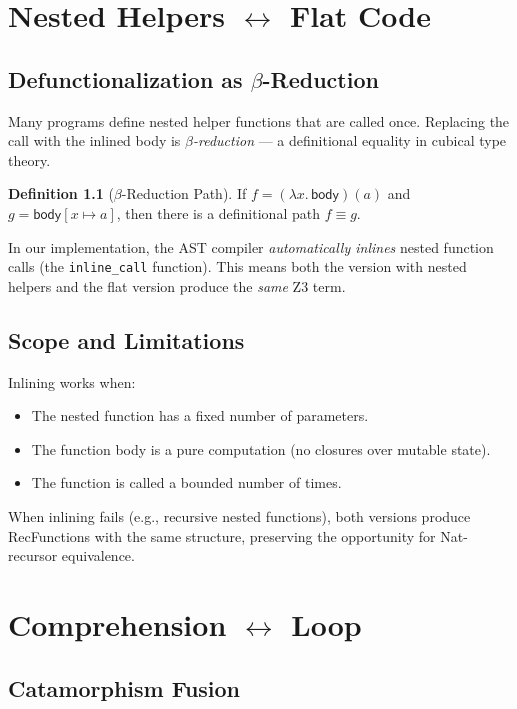 \documentclass[11pt,a4paper]{report}
\theoremstyle{definition}
\newtheorem{definition}{Definition}[chapter]
\theoremstyle{plain}
\begin{document}
\chapter{Nested Helpers $\leftrightarrow$ Flat Code}
\label{ch:defunc}

\section{Defunctionalization as $\beta$-Reduction}

Many programs define nested helper functions that are called once.
Replacing the call with the inlined body is \emph{$\beta$-reduction}
--- a definitional equality in cubical type theory.

\begin{definition}[$\beta$-Reduction Path]
If $f = (\lambda x. \, \mathsf{body})(a)$ and $g = \mathsf{body}[x
\mapsto a]$, then there is a definitional path $f \equiv g$.
\end{definition}

In our implementation, the AST compiler \emph{automatically inlines}
nested function calls (the \texttt{inline\_call} function).  This means
both the version with nested helpers and the flat version produce the
\emph{same} Z3 term.

\section{Scope and Limitations}

Inlining works when:
\begin{itemize}
  \item The nested function has a fixed number of parameters.
  \item The function body is a pure computation (no closures over
    mutable state).
  \item The function is called a bounded number of times.
\end{itemize}

When inlining fails (e.g., recursive nested functions), both versions
produce RecFunctions with the same structure, preserving the
opportunity for Nat-recursor equivalence.


\chapter{Comprehension $\leftrightarrow$ Loop}
\label{ch:comp-loop}

\section{Catamorphism Fusion}
\end{document}
